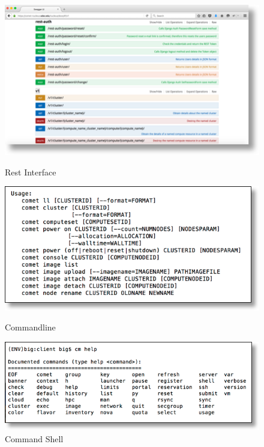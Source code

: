 \begin{figure}[!h] 
  \centering 
    \includegraphics[width=1.0\columnwidth]{images/client/Picture1.png} 
    \caption{Rest Interface}
    \label{F:1}

  \centering 
    \includegraphics[width=1.0\columnwidth]{images/client/Picture2.png} 
    \caption{Commandline }
    \label{F:2}

  \centering 
    \includegraphics[width=1.0\columnwidth]{images/client/Picture3.png} 
    \caption{Command Shell}
    \label{F:3}


\end{figure}

